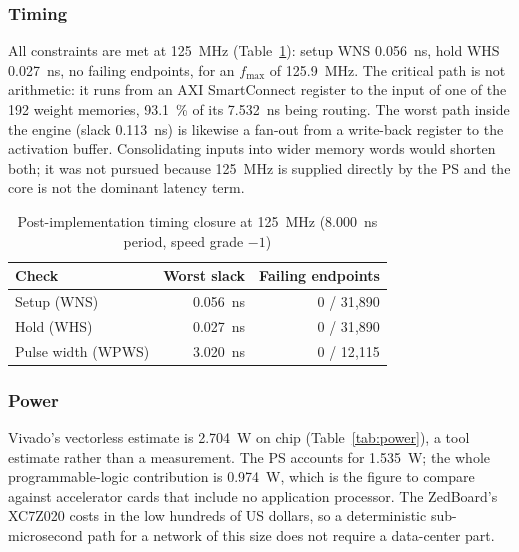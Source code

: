 \documentclass[final,5p,times,twocolumn]{elsarticle}
\begin{document}
\subsubsection{Timing}
All constraints are met at \SI{125}{\mega\hertz} (Table~\ref{tab:timing}):
setup WNS \SI{0.056}{\nano\second}, hold WHS \SI{0.027}{\nano\second}, no
failing endpoints, for an $f_{\max}$ of \SI{125.9}{\mega\hertz}. The critical
path is not arithmetic: it runs from an AXI SmartConnect register to the input
of one of the 192 weight memories, \SI{93.1}{\percent} of its
\SI{7.532}{\nano\second} being routing. The worst path inside the engine
(slack \SI{0.113}{\nano\second}) is likewise a fan-out from a write-back register
to the activation buffer. Consolidating inputs into wider memory words would
shorten both; it was not pursued because \SI{125}{\mega\hertz} is supplied
directly by the PS and the core is not the dominant latency term.

\begin{table}[htbp]
\centering
\caption{Post-implementation timing closure at \SI{125}{\mega\hertz}
(\SI{8.000}{\nano\second} period, speed grade $-1$)}
\label{tab:timing}
\begin{tabular}{lrr}
\toprule
Check & Worst slack & Failing endpoints \\
\midrule
Setup (WNS)       & \SI{0.056}{\nano\second} & 0 / 31{,}890 \\
Hold (WHS)        & \SI{0.027}{\nano\second} & 0 / 31{,}890 \\
Pulse width (WPWS)& \SI{3.020}{\nano\second} & 0 / 12{,}115 \\
\bottomrule
\end{tabular}
\end{table}

\subsubsection{Power}
Vivado's vectorless estimate is \SI{2.704}{\watt} on chip (Table~\ref{tab:power}),
a tool estimate rather than a measurement. The PS accounts for
\SI{1.535}{\watt}; the whole programmable-logic contribution is
\SI{0.974}{\watt}, which is the figure to compare against accelerator cards that
include no application processor. The ZedBoard's XC7Z020 costs in the low
hundreds of US dollars, so a deterministic sub-microsecond path for a network of
this size does not require a data-center part.
\end{document}
